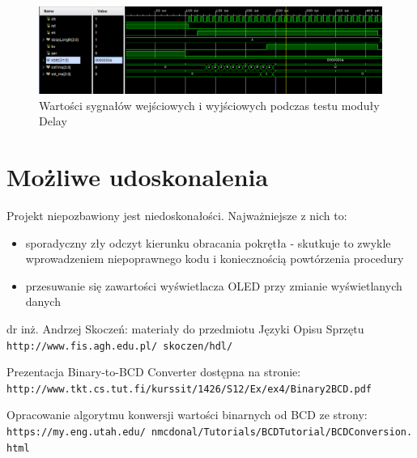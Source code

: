 \documentclass[12pt] {article}
\begin{document}
\begin{figure}[H]
\centering
\includegraphics[width=\textwidth]{res/behav_sims/Delay_behavSim_1.png}
\caption{Wartości sygnałów wejściowych i wyjściowych podczas testu moduły Delay}
\label{fig:behavDelay}
\end{figure}


\section{Możliwe udoskonalenia}
Projekt niepozbawiony jest niedoskonałości. Najważniejsze z nich to:
\begin{itemize}
\item sporadyczny zły odczyt kierunku obracania pokrętła - skutkuje to zwykle wprowadzeniem niepoprawnego kodu i koniecznością powtórzenia procedury
\item przesuwanie się zawartości wyświetlacza OLED przy zmianie wyświetlanych danych
\end{itemize}


\newpage
\begin{thebibliography}{9}

dr inż. Andrzej Skoczeń: materiały do przedmiotu Języki Opisu Sprzętu
\\\texttt{http://www.fis.agh.edu.pl/~skoczen/hdl/}

Prezentacja Binary-to-BCD Converter dostępna na stronie:
\\\texttt{http://www.tkt.cs.tut.fi/kurssit/1426/S12/Ex/ex4/Binary2BCD.pdf}

Opracowanie algorytmu konwersji wartości binarnych od BCD ze strony:
\\\texttt{https://my.eng.utah.edu/~nmcdonal/Tutorials/BCDTutorial/BCDConversion.html}


\end{thebibliography}
\end{document}
